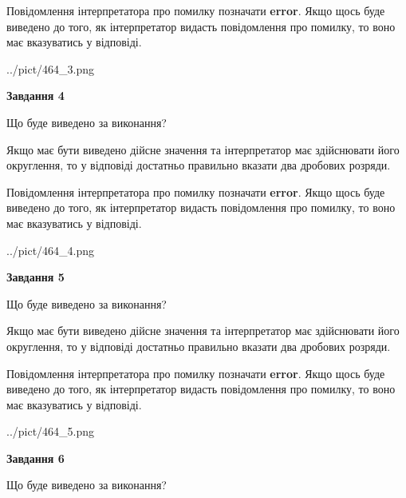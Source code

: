 \documentclass[12pt, ukrainian]{article}
\begin{document}
{\begin {Large}
Повідомлення інтерпретатора про помилку позначати \textbf{error}.
Якщо щось буде виведено до того, як інтерпретатор видасть повідомлення про помилку, 
то воно має вказуватись у відповіді. \par

\begin{center}
	{../pict/464_3.png}
\end{center}
\newpage

{\begin {center}\textbf{Завдання 4}\end {center}}\par
Що буде виведено за виконання? \par

Якщо має бути виведено дійсне значення та інтерпретатор має здійснювати його округлення, 
то у відповіді достатньо правильно вказати два дробових розряди.

Повідомлення інтерпретатора про помилку позначати \textbf{error}.
Якщо щось буде виведено до того, як інтерпретатор видасть повідомлення про помилку, 
то воно має вказуватись у відповіді. \par

\begin{center}
	{../pict/464_4.png}
\end{center}
\newpage

{\begin {center}\textbf{Завдання 5}\end {center}}\par
Що буде виведено за виконання? \par

Якщо має бути виведено дійсне значення та інтерпретатор має здійснювати його округлення, 
то у відповіді достатньо правильно вказати два дробових розряди.

Повідомлення інтерпретатора про помилку позначати \textbf{error}.
Якщо щось буде виведено до того, як інтерпретатор видасть повідомлення про помилку, 
то воно має вказуватись у відповіді. \par

\begin{center}
	{../pict/464_5.png}
\end{center}
\newpage

{\begin {center}\textbf{Завдання 6}\end {center}}\par
Що буде виведено за виконання? \par


\end{Large}}
\end{document}
